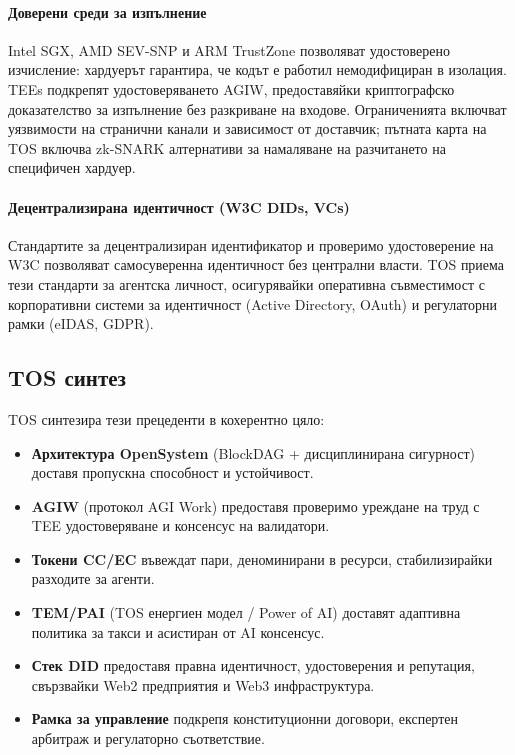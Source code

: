 \documentclass[11pt]{article}
\begin{document}
\paragraph{Доверени среди за изпълнение} Intel SGX, AMD SEV-SNP и ARM TrustZone позволяват удостоверено изчисление: хардуерът гарантира, че кодът е работил немодифициран в изолация. TEEs подкрепят удостоверяването AGIW, предоставяйки криптографско доказателство за изпълнение без разкриване на входове. Ограниченията включват уязвимости на странични канали и зависимост от доставчик; пътната карта на TOS включва zk-SNARK алтернативи за намаляване на разчитането на специфичен хардуер.

\paragraph{Децентрализирана идентичност (W3C DIDs, VCs)} Стандартите за децентрализиран идентификатор и проверимо удостоверение на W3C позволяват самосуверенна идентичност без централни власти. TOS приема тези стандарти за агентска личност, осигурявайки оперативна съвместимост с корпоративни системи за идентичност (Active Directory, OAuth) и регулаторни рамки (eIDAS, GDPR).

\subsection{TOS синтез}
TOS синтезира тези прецеденти в кохерентно цяло:
\begin{itemize}[noitemsep]
  \item \textbf{Архитектура OpenSystem} (BlockDAG + дисциплинирана сигурност) доставя пропускна способност и устойчивост.
  \item \textbf{AGIW} (протокол AGI Work) предоставя проверимо уреждане на труд с TEE удостоверяване и консенсус на валидатори.
  \item \textbf{Токени CC/EC} въвеждат пари, деноминирани в ресурси, стабилизирайки разходите за агенти.
  \item \textbf{TEM/PAI} (TOS енергиен модел / Power of AI) доставят адаптивна политика за такси и асистиран от AI консенсус.
  \item \textbf{Стек DID} предоставя правна идентичност, удостоверения и репутация, свързвайки Web2 предприятия и Web3 инфраструктура.
  \item \textbf{Рамка за управление} подкрепя конституционни договори, експертен арбитраж и регулаторно съответствие.
\end{itemize}
\end{document}
